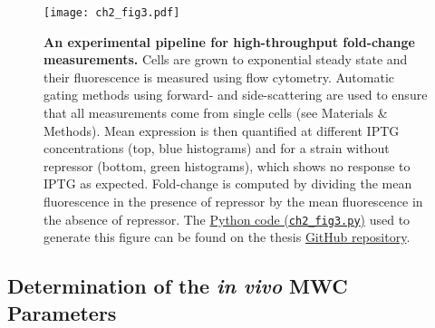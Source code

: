 \documentclass[12pt]{caltech_thesis}
\begin{document}
\hypertarget{fig:flowchart}{%
\begin{figure}
\centering
\texttt{[image: ch2\_fig3.pdf]}
\caption[{An experimental pipeline for high-throughput fold-change
measurements.}]{\textbf{An experimental pipeline for high-throughput
fold-change measurements.} Cells are grown to exponential steady state
and their fluorescence is measured using flow cytometry. Automatic
gating methods using forward- and side-scattering are used to ensure
that all measurements come from single cells (see Materials \& Methods).
Mean expression is then quantified at different IPTG concentrations
(top, blue histograms) and for a strain without repressor (bottom, green
histograms), which shows no response to IPTG as expected. Fold-change is
computed by dividing the mean fluorescence in the presence of repressor
by the mean fluorescence in the absence of repressor. The
\href{https://github.com/gchure/phd/blob/master/src/chapter_02/code/ch2_fig3.py}{Python
code (\texttt{ch2\_fig3.py})} used to generate this figure can be found
on the thesis \href{https://github.com/gchure/phd}{GitHub repository}.}
\label{fig:flowchart}
\end{figure}
}

\hypertarget{determination-of-the-in-vivo-mwc-parameters}{%
\subsection{\texorpdfstring{Determination of the \emph{in vivo} MWC
Parameters}{Determination of the in vivo MWC Parameters}}\label{determination-of-the-in-vivo-mwc-parameters}}
\end{document}
